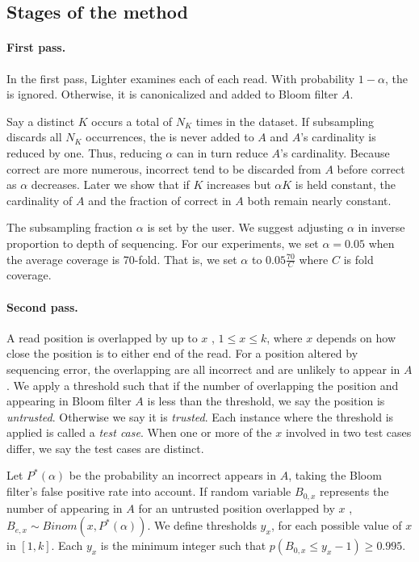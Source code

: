 \documentclass[10pt]{article}
\begin{document}
\subsection*{Stages of the method}
\paragraph{First pass.}    In the first pass, Lighter examines each \kmer of each read.  With probability $1 - \alpha$, the \kmer is ignored.  Otherwise, it is canonicalized and added to Bloom filter $A$.

Say a distinct \kmer $K$ occurs a total of $N_K$ times in the dataset.  If subsampling discards all $N_K$ occurrences, the \kmer is never added to $A$ and $A$'s cardinality is reduced by one.  Thus, reducing $\alpha$ can in turn reduce $A$'s cardinality.  Because correct \kmers are more numerous, incorrect \kmers tend to be discarded from $A$ before correct \kmers as $\alpha$ decreases.  Later we show that if $K$ increases but $\alpha K$ is held constant, the cardinality of $A$ and the fraction of correct \kmers in $A$ both remain nearly constant.

The subsampling fraction $\alpha$ is set by the user.  We suggest adjusting $\alpha$ in inverse proportion to depth of sequencing.  For our experiments, we set $\alpha=0.05$ when the average coverage is 70-fold.  That is, we set $\alpha$ to $0.05\frac{70}{C}$ where $C$ is fold coverage.

\paragraph{Second pass.} 
A read position is overlapped by up to $x$ \kmers, $1\le x\le k$, where $x$ depends on how close the position is to either end of the read.
For a position altered by sequencing error, the overlapping \kmers are all incorrect and are unlikely to appear in $A$.
We apply a threshold such that if the number of \kmers overlapping the position and appearing in Bloom filter $A$ is less than the threshold, we say the position is \emph{untrusted}.
Otherwise we say it is \emph{trusted}.
Each instance where the threshold is applied is called a \emph{test case}.
When one or more of the $x$ \kmers involved in two test cases differ, we say the test cases are distinct.

Let $P^*(\alpha)$ be the probability an incorrect \kmer appears in $A$, taking the Bloom filter's false positive rate into account.  If random variable $B_{0,x}$ represents the number of \kmers appearing in $A$ for an untrusted position overlapped by $x$ \kmers, $B_{e,x} \sim Binom(x,P^*(\alpha))$.  We define thresholds $y_x$, for each possible value of $x$ in $[1, k]$.  Each $y_x$ is the minimum integer such that $p(B_{0,x}\le y_x - 1)\ge 0.995$.
\end{document}
